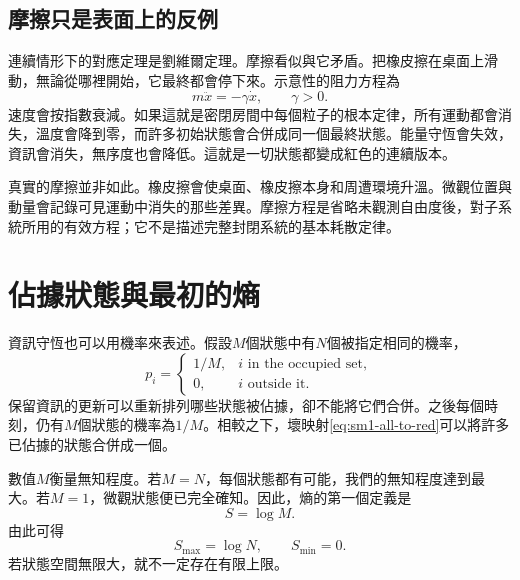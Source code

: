 \subsection{摩擦只是表面上的反例}

連續情形下的對應定理是劉維爾定理。摩擦看似與它矛盾。把橡皮擦在桌面上滑動，無論從哪裡開始，它最終都會停下來。示意性的阻力方程為
\begin{equation}
 m\ddot x=-\gamma\dot x,
 \qquad \gamma>0.
 \label{eq:sm1-drag}
\end{equation}
速度會按指數衰減。如果這就是密閉房間中每個粒子的根本定律，所有運動都會消失，溫度會降到零，而許多初始狀態會合併成同一個最終狀態。能量守恆會失效，資訊會消失，無序度也會降低。這就是一切狀態都變成紅色的連續版本。

真實的摩擦並非如此。橡皮擦會使桌面、橡皮擦本身和周遭環境升溫。微觀位置與動量會記錄可見運動中消失的那些差異。摩擦方程是省略未觀測自由度後，對子系統所用的有效方程；它不是描述完整封閉系統的基本耗散定律。

\begin{classroomqa}
\end{classroomqa}

\section{佔據狀態與最初的熵}

資訊守恆也可以用機率來表述。假設\(M\)個狀態中有\(N\)個被指定相同的機率，
\begin{equation}
 p_i=
 \begin{cases}
 1/M, & i\text{ in the occupied set},\\
 0, & i\text{ outside it}.
 \end{cases}
 \label{eq:sm1-uniform-occupied}
\end{equation}
保留資訊的更新可以重新排列哪些狀態被佔據，卻不能將它們合併。之後每個時刻，仍有\(M\)個狀態的機率為\(1/M\)。相較之下，壞映射\eqref{eq:sm1-all-to-red}可以將許多已佔據的狀態合併成一個。

數值\(M\)衡量無知程度。若\(M=N\)，每個狀態都有可能，我們的無知程度達到最大。若\(M=1\)，微觀狀態便已完全確知。因此，熵的第一個定義是
\begin{equation}
 S=\log M.
 \label{eq:sm1-entropy-logm}
\end{equation}
由此可得
\begin{equation}
 S_{\max}=\log N,
 \qquad
 S_{\min}=0.
\end{equation}
若狀態空間無限大，就不一定存在有限上限。

